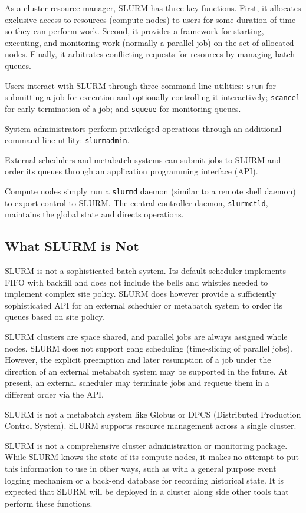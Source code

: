 As a cluster resource manager, SLURM has three key functions.  First,
it allocates exclusive access to resources (compute nodes) to users for 
some duration of time so they can perform work.  Second, it provides 
a framework for starting, executing, and monitoring work (normally a 
parallel job) on the set of allocated nodes.  Finally, it arbitrates 
conflicting requests for resources by managing batch queues.

Users interact with SLURM through three command line utilities: 
{\tt srun} for submitting a job for execution and optionally controlling it
interactively; 
{\tt scancel} for early termination of a job; 
and {\tt squeue} for monitoring queues.

System administrators perform priviledged operations through an additional
command line utility: {\tt slurmadmin}.

External schedulers and metabatch systems can submit jobs to SLURM and
order its queues through an application programming interface (API).

Compute nodes simply run a {\tt slurmd} daemon (similar to a remote shell 
daemon) to export control to SLURM.  The central controller daemon,
{\tt slurmctld}, maintains the global state and directs operations.

\subsection{What SLURM is Not}

SLURM is not a sophisticated batch system.  Its default scheduler
implements FIFO with backfill and does not include the bells and 
whistles needed to implement complex site policy.
SLURM does however provide a sufficiently sophisticated API for an external 
scheduler or metabatch system to order its queues based on site policy.

SLURM clusters are space shared, and parallel jobs are always 
assigned whole nodes.  SLURM does not support gang scheduling (time-slicing 
of parallel jobs). However, the explicit preemption and later resumption 
of a job under the direction of an external metabatch system may be supported 
in the future. At present, an external scheduler may terminate jobs and 
requeue them in a different order via the API. 

SLURM is not a metabatch system like Globus or DPCS (Distributed Production 
Control System).  SLURM supports resource management across a single cluster.

SLURM is not a comprehensive cluster administration or monitoring package.  
While SLURM knows the state of its compute nodes, it makes no attempt to put
this information to use in other ways, such as with a general purpose event
logging mechanism or a back-end database for recording historical state.
It is expected that SLURM will be deployed in a cluster along side other 
tools that perform these functions. 


